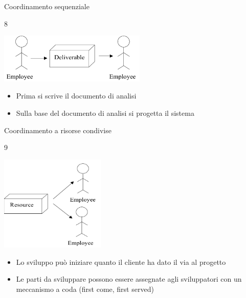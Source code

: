 \documentclass{beamer}
\begin{document}
\begin{frame}{\centerline{Coordinamento sequenziale}}
8

\begin{center}
\includegraphics[width=70mm]{P2023.AIBCCSS.IlConcettoDiSoftware/img-img11.png}
\end{center}

\begin{itemize}
\item  Prima si scrive il documento di analisi


\item  Sulla base del documento di analisi si progetta il sistema


 
\end{itemize}

\end{frame}

\begin{frame}{\centerline{Coordinamento a risorse condivise}}
9
\begin{center}
\includegraphics[width=50mm]{P2023.AIBCCSS.IlConcettoDiSoftware/img-img12.png}
\end{center}

\begin{itemize}
\item  Lo sviluppo pu\`{o} iniziare quanto il cliente ha dato il via al progetto

\item Le parti da sviluppare possono essere assegnate agli sviluppatori con un meccanismo a coda (first come, first served)


\end{itemize}


\end{frame}
\end{document}
